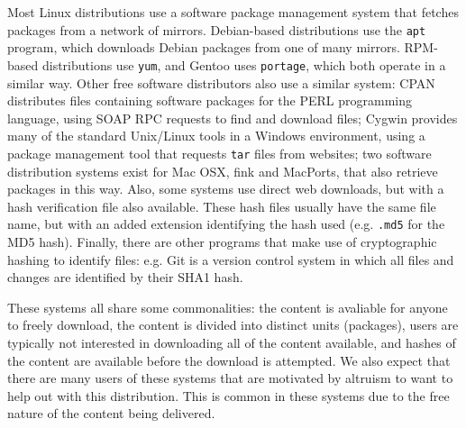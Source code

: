 \documentclass{sig-alt-release2}
\begin{document}
Most Linux distributions use a software package management system
that fetches packages from a network of mirrors.
Debian-based distributions use the \texttt{apt} program, which
downloads Debian packages from one of many mirrors. RPM-based
distributions use \texttt{yum}, and Gentoo uses \texttt{portage},
which both operate in a similar way. Other free software
distributors also use a similar system: CPAN distributes files
containing software packages for the PERL programming language,
using SOAP RPC requests to find and download files; Cygwin provides
many of the standard Unix/Linux tools in a Windows environment,
using a package management tool that requests \texttt{tar} files from
websites; two software distribution systems exist for Mac OSX,
fink and MacPorts, that also retrieve packages in this way. Also,
some systems use direct web downloads, but with a hash verification
file also available. These
hash files usually have the same file name, but with an added
extension identifying the hash used (e.g. \texttt{.md5} for the MD5
hash). Finally, there are other programs that make use of
cryptographic hashing to identify files: e.g. Git is a version
control system in which all files and changes are identified by
their SHA1 hash.

These systems all share some commonalities: the content is avaliable
for anyone to freely download, the content is divided into distinct
units (packages), users are typically not interested in downloading
all of the content available, and hashes of the content are
available before the download is attempted. We also expect that
there are many users of these systems that are motivated by
altruism to want to help out with this distribution. This is common
in these systems due to the free nature of the content being
delivered.

\end{document}
